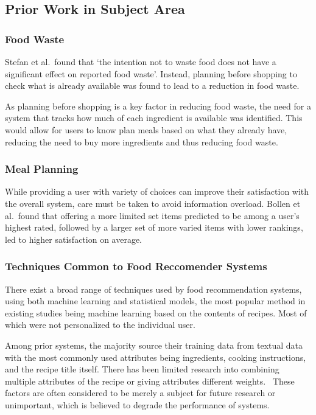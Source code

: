 \subsection{Prior Work in Subject Area}
\subsubsection{Food Waste}
Stefan et al.\ found that \enquote*{the intention not to waste food does not have a
significant effect on reported food waste}. Instead, planning before shopping to
check what is already available was found to lead to a reduction in food waste.~\cite{stefan_avoiding_2013}

As planning before shopping is a key factor in reducing food waste, the need for a system
that tracks how much of each ingredient is available was identified. This would allow for
users to know plan meals based on what they already have, reducing the need to buy more ingredients
and thus reducing food waste.

\subsubsection{Meal Planning}
\label{sec:overload_intro}While providing a user with variety of choices can improve their satisfaction
with the overall system, care must be taken to avoid information overload.
Bollen et al.\ found that offering a more limited set items predicted to be among a user's
highest rated, followed by a larger set of more varied items with lower rankings, led to
higher satisfaction on average.~\cite{bollen_understanding_2010}

\subsubsection{Techniques Common to Food Reccomender Systems}
There exist a broad range of techniques used by food recommendation systems, using both machine learning
and statistical models, the most popular method in existing studies being machine learning based on the
contents of recipes. Most of which were not personalized to the individual user.~\cite{bondevik_systematic_2024}

Among prior systems, the majority source their training data from textual data with the most commonly used
attributes being ingredients, cooking instructions, and the recipe title itself. There has been limited research
into combining multiple attributes of the recipe or giving attributes different weights.~\cite{chen_cross-modal_2017} These factors are often
considered to be merely a subject for future research or unimportant, which is believed to degrade the performance
of systems.~\cite{bondevik_systematic_2024}

